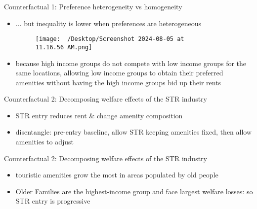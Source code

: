 \begin{frame}{Counterfactual 1: Preference heterogeneity vs homogeneity}
	\begin{itemize}
        \item ... but inequality is lower when preferences are heterogeneous
        \begin{figure}
            \centering
            \texttt{[image: ~/Desktop/Screenshot 2024-08-05 at 11.16.56 AM.png]}
            \caption{}
            \label{fig:photo}
        \end{figure}
        \item because high income groups do not compete with low income groups for the same locations, allowing low income groups to obtain their preferred amenities without having the high income groups bid up their rents
	\end{itemize}
\end{frame}

\begin{frame}{Counterfactual 2: Decomposing welfare effects of the STR industry}
	\begin{itemize}
		\item STR entry reduces rent \& change amenity composition
        \item disentangle: pre-entry baseline, allow STR keeping amenities fixed, then allow amenities to adjust
	\end{itemize}
\end{frame}
\begin{frame}{Counterfactual 2: Decomposing welfare effects of the STR industry}
	\begin{itemize}
		\item touristic amenities grow the most in areas populated by old people
        \begin{figure}
            \centering
            \caption{}
            \label{fig:photo}
        \end{figure}
        \item Older Families are the highest-income group and face largest welfare losses: so STR entry is progressive
	\end{itemize}
\end{frame}

